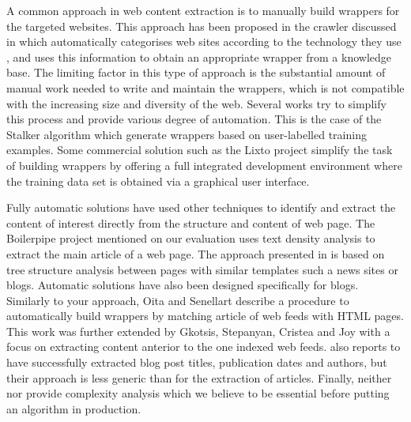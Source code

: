 A common approach in web content extraction is to manually build wrappers for the targeted websites. This approach has been proposed in the crawler discussed in \cite{faheem2012intelligent} which automatically categorises web sites according to the technology they use , and uses this information to obtain an appropriate wrapper from a knowledge base. The limiting factor in this type of approach is the substantial amount of manual work needed to write and maintain the wrappers, which is not compatible with the increasing size and diversity of the web. Several works try to simplify this process and provide various degree of automation. This is the case of the Stalker algorithm \cite{stalker} which generate wrappers based on user-labelled training examples. Some commercial solution such as the Lixto project \cite{lixto} simplify the task of building wrappers by offering a full integrated development environment where the training data set is obtained via a graphical user interface.

Fully automatic solutions have used other techniques to identify and extract the content of interest directly from the structure and content of web page. The Boilerpipe project \cite{kohlschuetter2010} mentioned on our evaluation uses text density analysis to extract the main article of a web page. The approach presented in \cite{treeedit} is based on tree structure analysis between pages with similar templates such a news sites or blogs. Automatic solutions have also been designed specifically for blogs. Similarly to your approach, Oita and Senellart \cite{oita2010} describe a procedure to automatically build wrappers by matching article of web feeds with HTML pages. This work was further extended by Gkotsis, Stepanyan, Cristea and Joy \cite{gkotsis2013} with a focus on extracting content anterior to the one indexed web feeds. \cite{gkotsis2013} also reports to have successfully extracted blog post titles, publication dates and authors, but their approach is less generic than for the extraction of articles. Finally, neither \cite{oita2010} nor \cite{gkotsis2013} provide complexity analysis which we believe to be essential before putting an algorithm in production.

